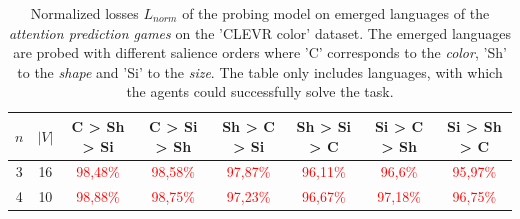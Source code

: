\begin{table}[ht]
    \centering
    \begin{tabular}{cc|c|c|c|c|c|c}
        \toprule
        $n$ & $|V|$ & \textbf{C > Sh > Si}     & \textbf{C > Si > Sh}     & \textbf{Sh > C > Si}     & \textbf{Sh > Si > C}     & \textbf{Si > C > Sh}     & \textbf{Si > Sh > C}     \\\midrule
        {3} & {16}  & \textcolor{red}{98,48\%} & \textcolor{red}{98,58\%} & \textcolor{red}{97,87\%} & \textcolor{red}{96,11\%} & \textcolor{red}{96,6\%}  & \textcolor{red}{95,97\%} \\
        {4} & {10}  & \textcolor{red}{98,88\%} & \textcolor{red}{98,75\%} & \textcolor{red}{97,23\%} & \textcolor{red}{96,67\%} & \textcolor{red}{97,18\%} & \textcolor{red}{96,75\%} \\
        \bottomrule
    \end{tabular}
    \caption{Normalized losses $L_{norm}$ of the probing model on emerged languages of the \emph{attention prediction games} on the 'CLEVR color' dataset. The emerged languages are probed with different salience orders where 'C' corresponds to the \emph{color}, 'Sh' to the \emph{shape} and 'Si' to the \emph{size}. The table only includes languages, with which the agents could successfully solve the task.}
    \label{tab:probing:attention-predictor:colour}
\end{table}

